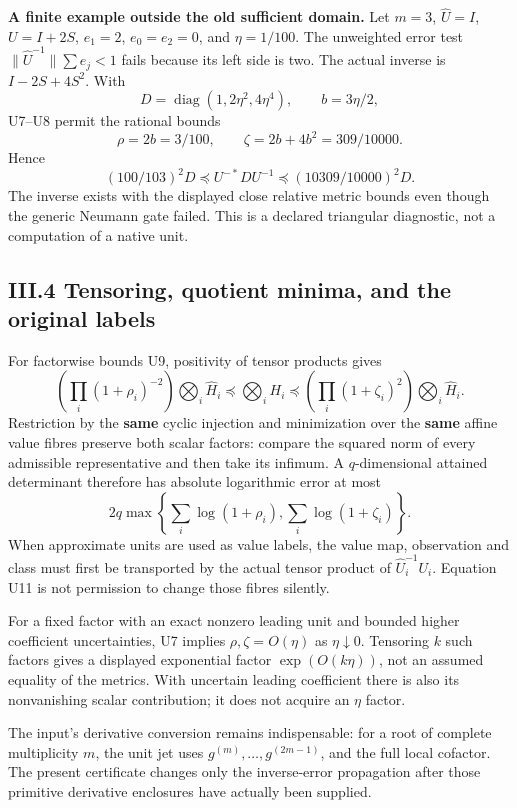 \documentclass[11pt]{article}
\begin{document}
\textbf{A finite example outside the old sufficient domain.} Let \(m=3\), \(\widehat U=I\), \(U=I+2S\), \(e_1=2\), \(e_0=e_2=0\), and \(\eta=1/100\). The unweighted error test \(\|\widehat U^{-1}\|\sum e_j<1\) fails because its left side is two. The actual inverse is \(I-2S+4S^2\). With \[
 D=\operatorname{diag}(1,2\eta^2,4\eta^4),\qquad b=3\eta/2,
\] U7--U8 permit the rational bounds \[
 \rho=2b=3/100,\qquad
 \zeta=2b+4b^2=309/10000.
\] Hence \[
 (100/103)^2D\preceq U^{-*}DU^{-1}
 \preceq(10309/10000)^2D.
 \tag{U10}
\] The inverse exists with the displayed close relative metric bounds even though the generic Neumann gate failed. This is a declared triangular diagnostic, not a computation of a native unit.

\subsection{III.4 Tensoring, quotient minima, and the original labels}\label{iii.4-tensoring-quotient-minima-and-the-original-labels}

For factorwise bounds U9, positivity of tensor products gives \[
 \boxed{\left(\prod_i(1+\rho_i)^{-2}\right)
 \bigotimes_i\widehat H_i
 \preceq\bigotimes_iH_i
 \preceq
 \left(\prod_i(1+\zeta_i)^2\right)
 \bigotimes_i\widehat H_i.}
 \tag{U11}
\] Restriction by the \textbf{same} cyclic injection and minimization over the \textbf{same} affine value fibres preserve both scalar factors: compare the squared norm of every admissible representative and then take its infimum. A \(q\)-dimensional attained determinant therefore has absolute logarithmic error at most \[
 \boxed{2q\max\left\{\sum_i\log(1+\rho_i),
                        \sum_i\log(1+\zeta_i)\right\}.}
 \tag{U12}
\] When approximate units are used as value labels, the value map, observation and class must first be transported by the actual tensor product of \(\widehat U_i^{-1}U_i\). Equation U11 is not permission to change those fibres silently.

For a fixed factor with an exact nonzero leading unit and bounded higher coefficient uncertainties, U7 implies \(\rho,\zeta=O(\eta)\) as \(\eta\downarrow0\). Tensoring \(k\) such factors gives a displayed exponential factor \(\exp(O(k\eta))\), not an assumed equality of the metrics. With uncertain leading coefficient there is also its nonvanishing scalar contribution; it does not acquire an \(\eta\) factor.

The input's derivative conversion remains indispensable: for a root of complete multiplicity \(m\), the unit jet uses \(g^{(m)},\ldots,g^{(2m-1)}\), and the full local cofactor. The present certificate changes only the inverse-error propagation after those primitive derivative enclosures have actually been supplied.
\end{document}
